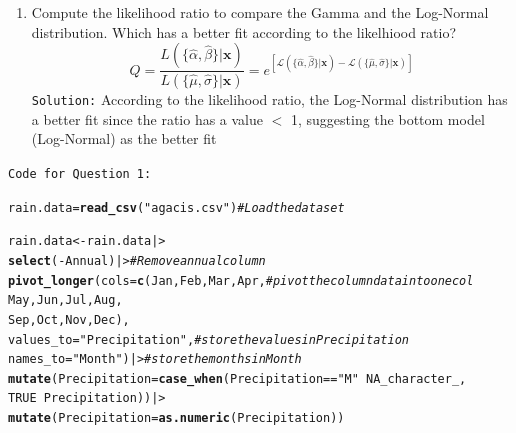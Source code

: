 \documentclass{article}\usepackage[]{graphicx}\usepackage[]{xcolor}
\makeatletter
\newcommand{\hlnum}[1]{\textcolor[rgb]{0.686,0.059,0.569}{#1}}%
\newcommand{\hlsng}[1]{\textcolor[rgb]{0.192,0.494,0.8}{#1}}%
\newcommand{\hlcom}[1]{\textcolor[rgb]{0.678,0.584,0.686}{\textit{#1}}}%
\newcommand{\hlopt}[1]{\textcolor[rgb]{0,0,0}{#1}}%
\newcommand{\hldef}[1]{\textcolor[rgb]{0.345,0.345,0.345}{#1}}%
\newcommand{\hlkwb}[1]{\textcolor[rgb]{0.69,0.353,0.396}{#1}}%
\newcommand{\hlkwc}[1]{\textcolor[rgb]{0.333,0.667,0.333}{#1}}%
\newcommand{\hlkwd}[1]{\textcolor[rgb]{0.737,0.353,0.396}{\textbf{#1}}}%
\newenvironment{kframe}{%
 \def\at@end@of@kframe{}%
 \ifinner\ifhmode%
  \def\at@end@of@kframe{\end{minipage}}%
  \begin{minipage}{\columnwidth}%
 \fi\fi%
 \def\FrameCommand##1{\hskip\@totalleftmargin \hskip-\fboxsep
 \colorbox{shadecolor}{##1}\hskip-\fboxsep
     \hskip-\linewidth \hskip-\@totalleftmargin \hskip\columnwidth}%
 \MakeFramed {\advance\hsize-\width
   \@totalleftmargin\z@ \linewidth\hsize
   \@setminipage}}%
 {\par\unskip\endMakeFramed%
 \at@end@of@kframe}
\newenvironment{knitrout}{}{} %
\makeatother
\begin{document}
\begin{enumerate}
\begin{enumerate}
    \\
    \item Compute the likelihood ratio to compare the Gamma and the Log-Normal distribution.
    Which has a better fit according to the likelhiood ratio?
    \[Q = \frac{L(\{\hat{\alpha}, \hat{\beta}\}|\mathbf{x})}{L(\{\hat{\mu}, \hat{\sigma}\}|\mathbf{x})}=e^{\left[\mathcal{L}(\{\hat{\alpha}, \hat{\beta}\}|\mathbf{x}) - \mathcal{L}(\{\hat{\mu}, \hat{\sigma}\}|\mathbf{x})\right]}\]
    \texttt{Solution:} According to the likelihood ratio, the Log-Normal distribution has a         better fit since the ratio has a value $<$ 1, suggesting the bottom model (Log-Normal) as       the better fit
  \end{enumerate}
  
\texttt{Code for Question 1:}
\begin{knitrout}\scriptsize
{}\color{fgcolor}\begin{kframe}
\begin{alltt}
\hldef{rain.data} \hlkwb{=} \hlkwd{read_csv}\hldef{(}\hlsng{"agacis.csv"}\hldef{)} \hlcom{#Load the data set}
\end{alltt}


{\ttfamily\noindent\itshape{}}\begin{alltt}
\hldef{rain.data} \hlkwb{<-} \hldef{rain.data |>}
  \hlkwd{select}\hldef{(}\hlopt{-}\hldef{Annual) |>}                          \hlcom{# Remove annual column }
  \hlkwd{pivot_longer}\hldef{(}\hlkwc{cols} \hldef{=} \hlkwd{c}\hldef{(Jan, Feb, Mar, Apr,}   \hlcom{# pivot the column data into one col}
                        \hldef{May, Jun, Jul, Aug,}
                        \hldef{Sep, Oct, Nov, Dec),}
               \hlkwc{values_to} \hldef{=} \hlsng{"Precipitation"}\hldef{,}   \hlcom{# store the values in Precipitation}
               \hlkwc{names_to} \hldef{=} \hlsng{"Month"}\hldef{) |>}         \hlcom{# store the months in Month}
  \hlkwd{mutate}\hldef{(}\hlkwc{Precipitation} \hldef{=} \hlkwd{case_when}\hldef{(Precipitation} \hlopt{==} \hlsng{"M"} \hlopt{~} \hlnum{NA_character_}\hldef{,}
                                   \hlnum{TRUE}                 \hlopt{~} \hldef{Precipitation))|>}
  \hlkwd{mutate}\hldef{(}\hlkwc{Precipitation} \hldef{=} \hlkwd{as.numeric}\hldef{(Precipitation))}


\end{alltt}
\end{kframe}
\end{knitrout}
\end{enumerate}
\end{document}
